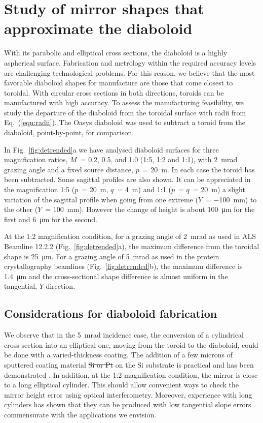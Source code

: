 \documentclass{iucr}       %
\newcommand{\inred}[1]{{\color{red}#1}}
\begin{document}
\section{Study of mirror shapes that approximate the diaboloid}
\label{sec:approximatedShapes}

With its parabolic and elliptical cross sections, the diaboloid is a highly aspherical surface. Fabrication and metrology within the required accuracy levels are challenging technological problems. For this reason, we believe that the most favorable diaboloid shapes for manufacture are those that come closest to toroidal. With circular cross sections in both directions, toroids can be manufactured with high accuracy. To assess the manufacturing feasibility, we study the departure of the diaboloid from the toroidal surface with radii from Eq.~(\ref{eqn:radii}). The Oasys diaboloid was used to subtract a toroid from the diaboloid, point-by-point, for comparison.

In Fig.~\ref{fig:detrended}a we have analysed diaboloid surfaces for three magnification ratios, $M$~= 0.2, 0.5, and 1.0 (1:5, 1:2 and 1:1), with \SI{2}{\milli\radian} grazing angle and a fixed source distance, $p$~= \SI{20}{\meter}. In each case the toroid has been subtracted. Some sagittal profiles are also shown. It can be appreciated in the magnification 1:5 ($p$~= \SI{20}{\meter}, $q$~= \SI{4}{\meter}) and 1:1 ($p$~= $q$~= \SI{20}{\meter}) a slight variation of the sagittal profile when going from one extreme ($Y$~= \SI{-100}{\milli\meter}) to the other ($Y$~= \SI{100}{\milli\meter}). However the change of height is about \SI{100}{\micro\meter} for the first and \SI{6}{\micro\meter} for the second. 

At the 1:2 magnification condition, for a grazing angle of \SI{2}{\milli\radian} as used in ALS Beamline 12.2.2 (Fig.~\ref{fig:detrended}a), the maximum difference from the toroidal shape is \SI{25}{\micro\meter}. For a grazing angle of \SI{5}{\milli\radian} as used in the protein crystallography beamlines (Fig.~\ref{fig:detrended}b), the maximum difference is \SI{1.4}{\micro\meter} and the cross-sectional shape difference is almost uniform in the tangential, $Y$ direction.

\subsection{Considerations for diaboloid fabrication}
We observe that in the \SI{5}{\milli\radian} incidence case, the conversion of a cylindrical cross-section into an elliptical one, moving from the toroid to the diaboloid, could be done with a varied-thickness coating. The addition of a few microns of sputtered \inred{coating material \sout{Si or Pt}} on the Si substrate is practical and has been demonstrated \inred{\cite{Morawe}}. In addition, at the 1:2 magnification condition, the mirror is close to a long elliptical cylinder. This should allow convenient ways to check the mirror height error using optical interferometry. Moreover, experience with long cylinders has shown that they can be produced with low tangential slope errors commensurate with the applications we envision. 
\end{document}
